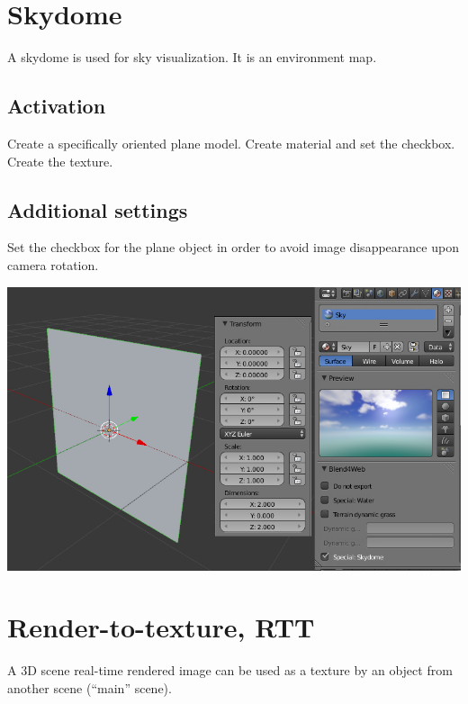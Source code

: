 \documentclass[a4paper,12pt,oneside]{sphinxmanual}
\begin{document}
\section{Skydome}
\label{textures:skydome}\label{textures:skydome-texture}\label{textures:index-12}
A skydome is used for sky visualization. It is an environment map.


\subsection{Activation}
\label{textures:id22}
Create a specifically oriented plane model. Create material and set the  checkbox. Create the  texture.


\subsection{Additional settings}
\label{textures:id23}
Set the  checkbox for the plane object in order to avoid image disappearance upon camera rotation.

{\hfill\includegraphics[width=1.000\linewidth]{skydome.jpg}\hfill}

\begin{DUlineblock}{0em}
\item[] 
\end{DUlineblock}
\label{textures:render-to-texture}

\section{Render-to-texture, RTT}
\label{textures:render-to-texture-rtt}\label{textures:index-13}
A 3D scene real-time rendered image can be used as a texture by an object from another scene (``main'' scene).
\end{document}
